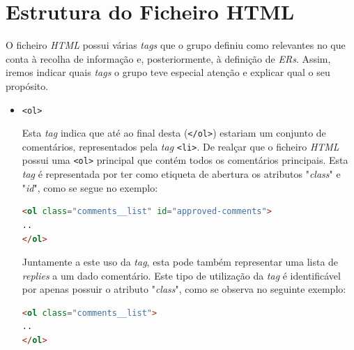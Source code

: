 \documentclass[a4paper,12pt]{report}
\newcommand*{\xml}[1]{\texttt{<#1>}}
\begin{document}
\vspace{1 cm}

\section{Estrutura do Ficheiro HTML}

\vspace{0.5cm}

O ficheiro \textit{HTML} possui várias \textit{tags} que o grupo definiu como relevantes no que conta à recolha de informação e, posteriormente, à definição de \textit{ERs}. Assim, iremos indicar quais \textit{tags} o grupo teve especial atenção e explicar qual o seu propósito.

\begin{itemize}
    \item 
    \xml{ol}
    \par Esta \textit{tag} indica que até ao final desta (\xml{/ol}) estariam um conjunto de comentários, representados pela \textit{tag} \xml{li}. De realçar que o ficheiro \textit{HTML} possui uma \xml{ol} principal que contém todos os comentários principais. Esta \textit{tag} é representada por ter como etiqueta de abertura os atributos "\textit{class}" e "\textit{id}", como se segue no exemplo:
    
\begin{center}
    \begin{lstlisting}[language = html]
<ol class="comments__list" id="approved-comments">
..
</ol>
    \end{lstlisting}    
\end{center}   

    Juntamente a este uso da \textit{tag}, esta pode também representar uma lista de \textit{replies} a um dado comentário. Este tipo de utilização da \textit{tag} é identificável por apenas possuir o atributo "\textit{class}", como se observa no seguinte exemplo:
    
\begin{center}
    \begin{lstlisting}[language = html]
<ol class="comments__list">
..
</ol>
    \end{lstlisting}    
\end{center}   
\end{itemize}

\vspace{1cm}
\end{document}
